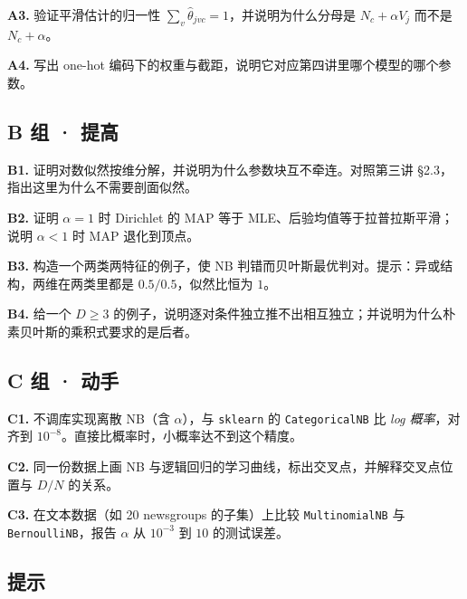 \documentclass[11pt,a4paper,fontset=windows,zihao=-4]{ctexart}
\begin{document}
\noindent\textbf{A3.} 验证平滑估计的归一性 $\sum_v\hat\theta_{jvc}=1$，并说明为什么分母是 $N_c+\alpha V_j$ 而不是 $N_c+\alpha$。

\noindent\textbf{A4.} 写出 one-hot 编码下的权重与截距，说明它对应第四讲里哪个模型的哪个参数。

\subsection*{B 组 · 提高}

\noindent\textbf{B1.} 证明对数似然按维分解，并说明为什么参数块互不牵连。对照第三讲 §2.3，指出这里为什么不需要剖面似然。

\noindent\textbf{B2.} 证明 $\alpha=1$ 时 Dirichlet 的 MAP 等于 MLE、后验均值等于拉普拉斯平滑；说明 $\alpha<1$ 时 MAP 退化到顶点。

\noindent\textbf{B3.} 构造一个两类两特征的例子，使 NB 判错而贝叶斯最优判对。提示：异或结构，两维在两类里都是 $0.5/0.5$，似然比恒为 $1$。

\noindent\textbf{B4.} 给一个 $D\ge3$ 的例子，说明逐对条件独立推不出相互独立；并说明为什么朴素贝叶斯的乘积式要求的是后者。

\subsection*{C 组 · 动手}

\noindent\textbf{C1.} 不调库实现离散 NB（含 $\alpha$），与 \texttt{sklearn} 的 \texttt{CategoricalNB} 比 \emph{log 概率}，对齐到 $10^{-8}$。直接比概率时，小概率达不到这个精度。

\noindent\textbf{C2.} 同一份数据上画 NB 与逻辑回归的学习曲线，标出交叉点，并解释交叉点位置与 $D/N$ 的关系。

\noindent\textbf{C3.} 在文本数据（如 20 newsgroups 的子集）上比较 \texttt{MultinomialNB} 与 \texttt{BernoulliNB}，报告 $\alpha$ 从 $10^{-3}$ 到 $10$ 的测试误差。

\subsection*{提示}
\end{document}
